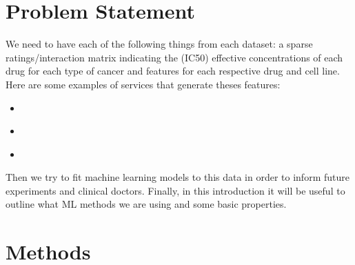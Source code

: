 \documentclass[letterpaper,10pt,english,openany,oneside]{sphinxmanual}
\begin{document}
\section{Problem Statement}
\label{\detokenize{intro:problem-statement}}
We need to have each of the following things from each dataset: a sparse ratings/interaction matrix indicating the (IC50) effective concentrations of each drug for each type of cancer and features for each respective drug and cell line. Here are some examples of services that generate theses features:
\begin{itemize}
\item {} 
%
\begin{footnote}[5]\sphinxAtStartFootnote
{}
%
\end{footnote}

\item {} 
%
\begin{footnote}[6]\sphinxAtStartFootnote
{}
%
\end{footnote}

\item {} 
%
\begin{footnote}[7]\sphinxAtStartFootnote
{}
%
\end{footnote}

\end{itemize}

Then we try to fit machine learning models to this data  in order to inform future experiments and clinical doctors. Finally, in this introduction it will be useful to outline what ML methods we are using and some basic properties.


\section{Methods}
\label{\detokenize{intro:methods}}
\end{document}
